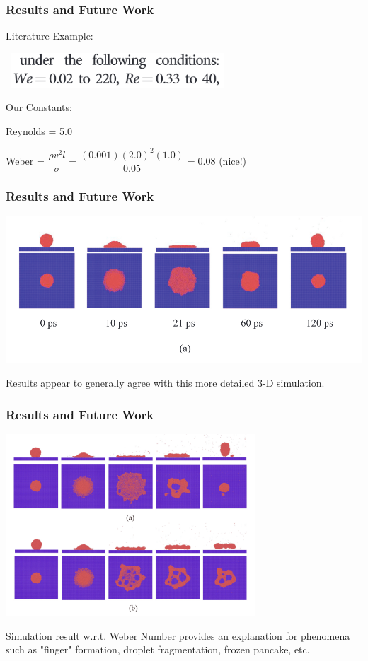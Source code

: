 \documentclass[12pt]{beamer}
\begin{document}
\begin{frame}
    \frametitle{Results and Future Work}
    Literature Example:

    \
    \includegraphics[width=0.6\textwidth]{img/wang-constants.png}

    Our Constants:

    Reynolds = 5.0

    Weber = $\dfrac{\rho v^2 l}{\sigma} 
    = \dfrac{(0.001)(2.0)^2(1.0)}{0.05}
    = 0.08$ (nice!)
\end{frame}
\begin{frame}
    \frametitle{Results and Future Work}
    \includegraphics[width=\textwidth]{img/wang-sim.png}

    Results appear to generally agree with this more detailed 3-D simulation.
\end{frame}
\begin{frame}
    \frametitle{Results and Future Work}
    \includegraphics[width=0.7\textwidth]{img/wang-high-weber.png}

    Simulation result w.r.t. Weber Number provides an explanation for phenomena 
    such as "finger" formation, droplet fragmentation, frozen pancake, etc.
\end{frame}
\end{document}

